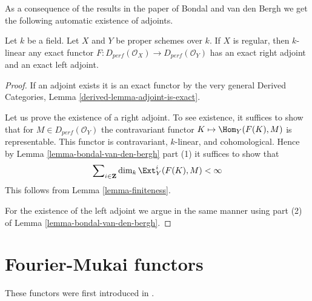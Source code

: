 \noindent
As a consequence of the results in the paper of Bondal and van den Bergh
we get the following automatic existence of adjoints.

\begin{lemma}
\label{lemma-always-right-adjoints}
Let $k$ be a field. Let $X$ and $Y$ be proper schemes over $k$.
If $X$ is regular, then $k$-linear any exact functor
$F : D_{perf}(\mathcal{O}_X) \to D_{perf}(\mathcal{O}_Y)$
has an exact right adjoint and an exact left adjoint.
\end{lemma}

\begin{proof}
If an adjoint exists it is an exact functor by the very general
Derived Categories, Lemma \ref{derived-lemma-adjoint-is-exact}.

\medskip\noindent
Let us prove the existence of a right adjoint.
To see existence, it suffices to show that for
$M \in D_{perf}(\mathcal{O}_Y)$ the contravariant functor
$K \mapsto \Hom_Y(F(K), M)$ is representable.
This functor is contravariant, $k$-linear, and cohomological.
Hence by Lemma \ref{lemma-bondal-van-den-bergh} part (1)
it suffices to show that
$$
\sum\nolimits_{i \in \mathbf{Z}} \dim_k \Ext^i_Y(F(K), M) < \infty
$$
This follows from Lemma \ref{lemma-finiteness}.

\medskip\noindent
For the existence of the left adjoint we argue in the same
manner using part (2) of Lemma \ref{lemma-bondal-van-den-bergh}.
\end{proof}






\section{Fourier-Mukai functors}
\label{section-fourier-mukai}

\noindent
These functors were first introduced in \cite{Mukai}.

